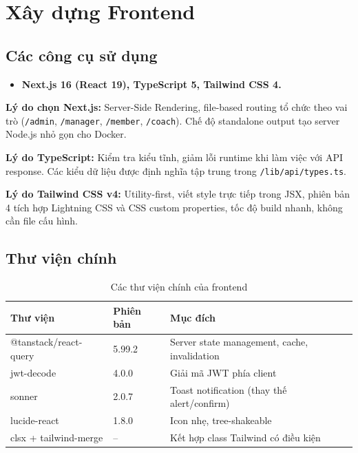 \section{Xây dựng Frontend}
\subsection{Các công cụ sử dụng}
\begin{itemize}
    \item \textbf{Next.js 16 (React 19), TypeScript 5, Tailwind CSS 4.}
\end{itemize}
\textbf{Lý do chọn Next.js:} Server-Side Rendering, file-based routing tổ chức theo vai trò (\texttt{/admin}, \texttt{/manager}, \texttt{/member}, \texttt{/coach}). Chế độ standalone output tạo server Node.js nhỏ gọn cho Docker.

\textbf{Lý do TypeScript:} Kiểm tra kiểu tĩnh, giảm lỗi runtime khi làm việc với API response. Các kiểu dữ liệu được định nghĩa tập trung trong \texttt{/lib/api/types.ts}.

\textbf{Lý do Tailwind CSS v4:} Utility-first, viết style trực tiếp trong JSX, phiên bản 4 tích hợp Lightning CSS và CSS custom properties, tốc độ build nhanh, không cần file cấu hình.

\subsection{Thư viện chính}
\begin{table}[h]
\centering
\begin{tabular}{|l|l|l|}
\hline
\textbf{Thư viện} & \textbf{Phiên bản} & \textbf{Mục đích} \\ \hline
@tanstack/react-query & 5.99.2 & Server state management, cache, invalidation \\
jwt-decode            & 4.0.0  & Giải mã JWT phía client \\
sonner                & 2.0.7  & Toast notification (thay thế alert/confirm) \\
lucide-react          & 1.8.0  & Icon nhẹ, tree-shakeable \\
clsx + tailwind-merge & --     & Kết hợp class Tailwind có điều kiện \\ \hline
\end{tabular}
\caption{Các thư viện chính của frontend}
\end{table}

